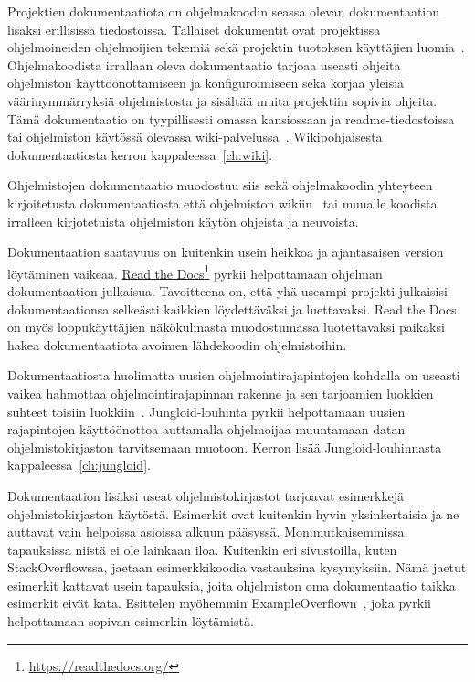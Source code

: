 \documentclass[finnish]{tktltiki2}
\theoremstyle{definition}
\theoremstyle{remark}
\begin{document}
Projektien dokumentaatiota on ohjelmakoodin seassa olevan dokumentaation lisäksi erillisissä tiedostoissa. Tällaiset dokumentit ovat projektissa ohjelmoineiden ohjelmoijien tekemiä sekä projektin tuotoksen käyttäjien luomia~\cite{using-wikis-in-sw}.
Ohjelmakoodista irrallaan oleva dokumentaatio tarjoaa useasti ohjeita ohjelmiston käyttöönottamiseen ja konfiguroimiseen sekä korjaa yleisiä väärinymmärryksiä ohjelmistosta ja sisältää muita projektiin sopivia ohjeita. Tämä dokumentaatio on tyypillisesti omassa kansiossaan ja readme-tiedostoissa tai ohjelmiston käytössä olevassa wiki-palvelussa~\cite{using-wikis-in-sw}. Wikipohjaisesta dokumentaatiosta kerron kappaleessa~\ref{ch:wiki}.

Ohjelmistojen dokumentaatio muodostuu siis sekä ohjelmakoodin yhteyteen kirjoitetusta dokumentaatiosta että ohjelmiston wikiin~\cite{using-wikis-in-sw} tai muualle koodista irralleen kirjotetuista ohjelmiston käytön ohjeista ja neuvoista.

Dokumentaation saatavuus on kuitenkin usein heikkoa ja ajantasaisen version löytäminen vaikeaa. \href{https://readthedocs.org/}{Read the Docs}\footnote{\url{https://readthedocs.org/}} pyrkii helpottamaan ohjelman dokumentaation julkaisua. Tavoitteena on, että yhä useampi projekti julkaisisi dokumentaationsa selkeästi kaikkien löydettäväksi ja luettavaksi. Read the Docs on myös loppukäyttäjien näkökulmasta muodostumassa luotettavaksi paikaksi hakea dokumentaatiota avoimen lähdekoodin ohjelmistoihin.

Dokumentaatiosta huolimatta uusien ohjelmointirajapintojen kohdalla on useasti vaikea hahmottaa ohjelmointirajapinnan rakenne ja sen tarjoamien luokkien suhteet toisiin luokkiin~\cite{jungloid-mining}. Jungloid-louhinta pyrkii helpottamaan uusien rajapintojen käyttöönottoa auttamalla ohjelmoijaa muuntamaan datan ohjelmistokirjaston tarvitsemaan muotoon. Kerron lisää Jungloid-louhinnasta kappaleessa~\ref{ch:jungloid}.

Dokumentaation lisäksi useat ohjelmistokirjastot tarjoavat esimerkkejä ohjelmistokirjaston käytöstä. Esimerkit ovat kuitenkin hyvin yksinkertaisia ja ne auttavat vain helpoissa asioissa alkuun pääsyssä. Monimutkaisemmissa tapauksissa niistä ei ole lainkaan iloa. Kuitenkin eri sivustoilla, kuten StackOverflowssa, jaetaan esimerkkikoodia vastauksina kysymyksiin. Nämä jaetut esimerkit kattavat usein tapauksia, joita ohjelmiston oma dokumentaatio taikka esimerkit eivät kata. Esittelen myöhemmin ExampleOverflown~\cite{example-overflow-social-media-for-code-recommendations}, joka pyrkii helpottamaan sopivan esimerkin löytämistä.
\end{document}
